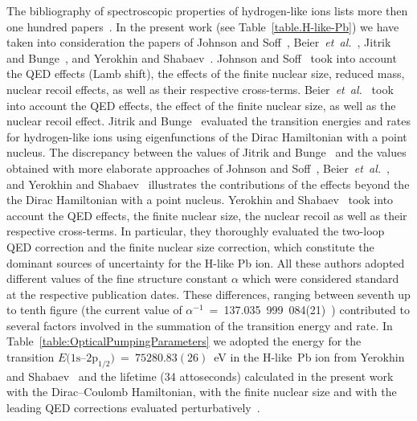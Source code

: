The bibliography of spectroscopic properties of hydrogen-like ions lists more then one hundred papers~\cite{NIST-ASD,YerokhinShabaev:2015}.  In the present work (see Table~\ref{table.H-like-Pb}) we have taken into consideration the papers of Johnson and Soff~\cite{JohnsonSoff:1985}, Beier~\textit{et~al.}~\cite{Beier:1997}, Jitrik and Bunge~\cite{JitrikBunge:2003}, and Yerokhin and Shabaev~\cite{YerokhinShabaev:2015}.  Johnson and Soff~\cite{JohnsonSoff:1985} took into account the QED effects (Lamb shift), the effects of the finite nuclear size, reduced mass, nuclear recoil effects, as well as their respective cross-terms.  Beier~\textit{et~al.}~\cite{Beier:1997} took into account the QED effects, the effect of the finite nuclear size, as well as the nuclear recoil effect.  Jitrik and Bunge~\cite{JitrikBunge:2003} evaluated the transition energies and rates for hydrogen-like ions using eigenfunctions of the Dirac Hamiltonian with a point nucleus.  The discrepancy between the values of Jitrik and Bunge~\cite{JitrikBunge:2003} and the values obtained with more elaborate approaches of Johnson and Soff~\cite{JohnsonSoff:1985}, Beier~\textit{et~al.}~\cite{Beier:1997}, and Yerokhin and Shabaev~\cite{YerokhinShabaev:2015} illustrates the contributions of the effects beyond the
the Dirac Hamiltonian with a point nucleus.  Yerokhin and Shabaev~\cite{YerokhinShabaev:2015} took into account the QED effects, the finite nuclear size, the nuclear recoil as well as their respective cross-terms.  In particular, they thoroughly evaluated the two-loop QED correction and the finite nuclear size correction, which constitute the dominant sources of uncertainty for the H-like Pb ion.  All these authors adopted different values of the fine structure constant $\alpha$ which were considered standard at the respective publication dates.  These differences, ranging between seventh up to tenth figure (the current value of \mbox{$\alpha^{-1}$~=~137.035~999~084(21)}~\cite{NIST-Constants}) contributed to several factors involved in the summation of the transition energy and rate.  In Table~\ref{table:OpticalPumpingParameters} we adopted the energy for the transition \mbox{$E(1\mathrm{s}$--$2\mathrm{p}_{1/2})$~=~$75280.83(26)$~eV} in the H-like~Pb ion from Yerokhin and Shabaev~\cite{YerokhinShabaev:2015} and the lifetime (34 attoseconds) calculated in the present work with the Dirac--Coulomb Hamiltonian, with the finite nuclear size and with the leading QED corrections evaluated perturbatively~\cite{graspMcKenzie1980}.
 
